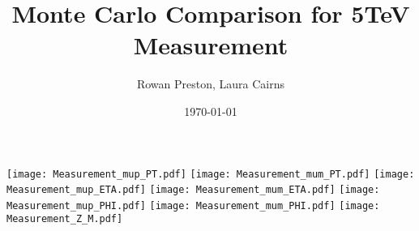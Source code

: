 \documentclass[a4paper]{article}
\title{Monte Carlo Comparison for 5TeV Measurement}
\author{Rowan Preston, Laura Cairns}
\date{\today}
\begin{document}
\maketitle

\texttt{[image: Measurement\_mup\_PT.pdf]}
\texttt{[image: Measurement\_mum\_PT.pdf]}
\texttt{[image: Measurement\_mup\_ETA.pdf]}
\texttt{[image: Measurement\_mum\_ETA.pdf]}
\texttt{[image: Measurement\_mup\_PHI.pdf]}
\texttt{[image: Measurement\_mum\_PHI.pdf]}
\texttt{[image: Measurement\_Z\_M.pdf]}

{}

\end{document}
